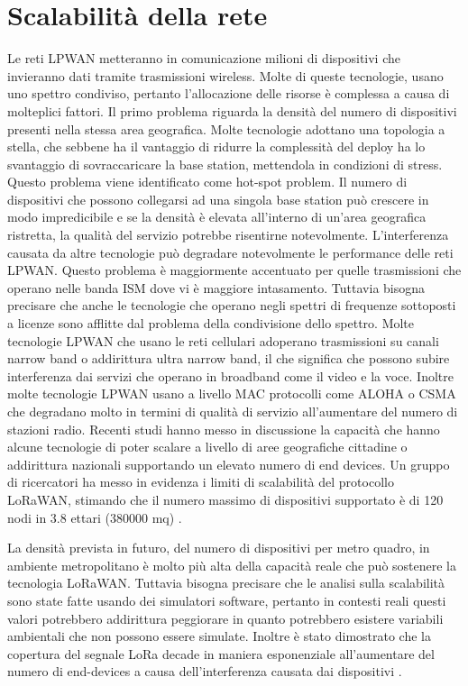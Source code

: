 \documentclass[12pt,a4paper,openright,twoside]{report}
\begin{document}
\section{Scalabilit\`a della rete}
Le reti LPWAN metteranno in comunicazione milioni di dispositivi che invieranno dati tramite trasmissioni wireless. Molte di queste tecnologie, usano uno spettro condiviso, pertanto l'allocazione delle risorse \`e complessa a causa di molteplici fattori. 
Il primo problema riguarda la densit\`a del numero di dispositivi presenti nella stessa area geografica. Molte tecnologie adottano una topologia a stella, che sebbene ha il vantaggio di ridurre la complessit\`a del deploy ha lo svantaggio di sovraccaricare la base station, mettendola in condizioni di stress. 
Questo problema viene identificato come hot-spot problem. Il numero di dispositivi che possono collegarsi ad una singola base station pu\`o crescere in modo impredicibile e se la densit\`a \`e elevata all'interno di un'area geografica ristretta, la qualit\`a del servizio potrebbe risentirne notevolmente.  
L'interferenza causata da altre tecnologie pu\`o degradare notevolmente le performance delle reti LPWAN. Questo problema \`e maggiormente accentuato per quelle trasmissioni che operano nelle banda ISM dove vi \`e maggiore intasamento. 
Tuttavia bisogna precisare che anche le tecnologie che operano negli spettri di frequenze sottoposti a licenze sono afflitte dal problema della condivisione dello spettro.
Molte tecnologie LPWAN che usano le reti cellulari adoperano trasmissioni su canali narrow band o addirittura ultra narrow band, il che significa che possono subire interferenza dai servizi che operano in broadband come il video e la voce. 
Inoltre molte tecnologie LPWAN usano a livello MAC protocolli come ALOHA o CSMA che degradano molto in termini di qualit\`a di servizio all'aumentare del numero di stazioni radio.
Recenti studi hanno messo in discussione la capacit\`a che hanno alcune tecnologie di poter scalare a livello di aree geografiche cittadine o addirittura nazionali supportando un elevato numero di end devices.
Un gruppo di ricercatori ha messo in evidenza i limiti di scalabilit\`a del protocollo LoRaWAN, stimando che il numero massimo di dispositivi supportato \`e di 120 nodi in 3.8 ettari (380000 mq) \cite{K11}.

La densit\`a prevista in futuro, del numero di dispositivi per metro quadro, in ambiente metropolitano \`e molto pi\`u alta della capacit\`a reale che pu\`o sostenere la tecnologia  LoRaWAN. 
Tuttavia bisogna precisare che le analisi sulla scalabilit\`a sono state fatte usando dei simulatori software, pertanto in contesti reali questi valori potrebbero addirittura peggiorare in quanto potrebbero esistere variabili ambientali che non possono essere simulate.  
Inoltre \`e stato dimostrato che la copertura del segnale LoRa decade in maniera esponenziale all'aumentare del numero di end-devices a causa dell'interferenza causata dai dispositivi \cite{K12}.
\end{document}
